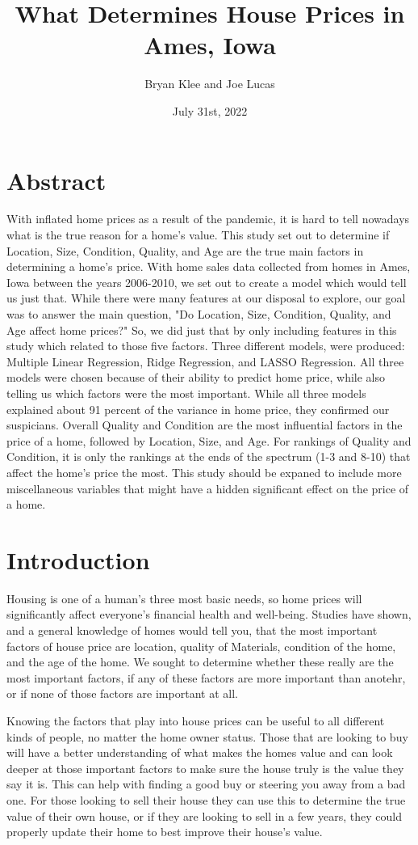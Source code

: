 \documentclass{article}
\title{What Determines House Prices in Ames, Iowa}
\author{Bryan Klee and Joe Lucas}
\date{July 31st, 2022}
\begin{document}
	\maketitle
	\section{Abstract}
	With inflated home prices as a result of the pandemic, it is hard to tell nowadays what is the true reason for a home's value. This study set out to determine if Location, Size, Condition, Quality, and Age are the true main factors in determining a home's price. With home sales data collected from homes in Ames, Iowa between the years 2006-2010, we set out to create a model which would tell us just that. While there were many features at our disposal to explore, our goal was to answer the main question, "Do Location, Size, Condition, Quality, and Age affect home prices?" So, we did just that by only including features in this study which related to those five factors. Three different models, were produced: Multiple Linear Regression, Ridge Regression, and LASSO Regression. All three models were chosen because of their ability to predict home price, while also telling us which factors were the most important. While all three models explained about 91 percent of the variance in home price, they confirmed our suspicians. Overall Quality and Condition are the most influential factors in the price of a home, followed by Location, Size, and Age. For rankings of Quality and Condition, it is only the rankings at the ends of the spectrum (1-3 and 8-10) that affect the home's price the most. This study should be expaned to include more miscellaneous variables that might have a hidden significant effect on the price of a home. 
	
	\section{Introduction}
	Housing is one of a human's three most basic needs, so home prices will significantly affect everyone's financial health and well-being. Studies have shown, and a general knowledge of homes would tell you, that the most important factors of house price are location, quality of Materials, condition of the home, and the age of the home. We sought to determine whether these really are the most important factors, if any of these factors are more important than anotehr, or if none of those factors are important at all. 
	
	Knowing the factors that play into house prices can be useful to all different kinds of people, no matter the home owner status. Those that are looking to buy will have a better understanding of what makes the homes value and can look deeper at those important factors to make sure the house truly is the value they say it is. This can help with finding a good buy or steering you away from a bad one. For those looking to sell their house they can use this to determine the true value of their own house, or if they are looking to sell in a few years, they could properly update their home to best improve their house's value.
	
\end{document}
